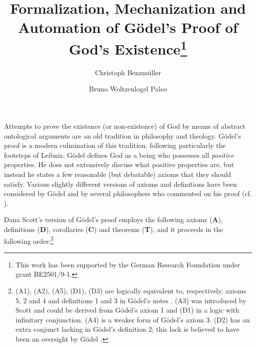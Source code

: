 \documentclass{llncs}
\title{ Formalization, Mechanization and Automation %
  of G\"{o}del's Proof of God's Existence\thanks{This work has been
    supported by the German Research Foundation under grant
    BE2501/9-1.}  }
\author{
  Christoph Benzm\"{u}ller\inst{1} 
  \and 
  Bruno Woltzenlogel Paleo\inst{2}
}
\institute{
  Dahlem Center for Intelligent Sstems, Freie Universit\"{a}t Berlin, Germany\\
  \email{c.benzmueller@gmail.com}
  \and 
  Theory and Logic Group, Vienna University of Technology, Austria \\
  \email{bruno@logic.at}
}
\begin{document}
\maketitle

Attempts to prove the existence (or non-existence) of God by means of
abstract ontological arguments are an old tradition in philosophy and
theology.  G\"{o}del's proof \cite{Goedel1970,GoedelNotes} is a modern culmination of
this tradition, following particularly the footsteps of Leibniz.
%
G\"{o}del defines God as a being who possesses all \emph{positive} properties.
He does not extensively discuss what positive properties are, 
but instead he states a few reasonable (but debatable) axioms that they should satisfy.
Various slightly different versions of axioms and definitions have
been considered by G\"{o}del and by several philosophers who commented
on his proof
(cf. \cite{sobel2004logic,AndersonGettings,Fitting,Adams,ContemporaryBibliography}). 

Dana Scott's version of G\"odel's proof \cite{ScottNotes} employs the
following axioms (\textbf{A}), definitions (\textbf{D}), corollaries
(\textbf{C}) and theorems (\textbf{T}), and it proceeds in the
following order:\footnote{ (A1), (A2), (A5), (D1), (D3) are logically
  equivalent to, respectively, axioms 5, 2 and 4 and definitions 1 and
  3 in G\"odel's notes \cite{Goedel1970,GoedellNotes}. (A3) was introduced by
  Scott \cite{ScottNotes} and could be derived from G\"odel's axiom 1 and
  (D1) in a logic with infinitary conjunction. (A4) is a weaker form
  of G\"odel's axiom 3. (D2) has an extra conjunct lacking in
  G\"odel's definition 2; this lack is believed to have been an
  oversight by G\"odel \cite{Hazen}. }
\end{document}
